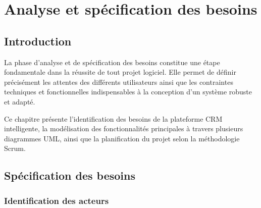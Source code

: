 
\chapter{Analyse et spécification des besoins}

\section{Introduction}
\label{sec:chap2_introduction}

La phase d'analyse et de spécification des besoins constitue une étape fondamentale dans la
réussite de tout projet logiciel. Elle permet de définir précisément les attentes des différents
utilisateurs ainsi que les contraintes techniques et fonctionnelles indispensables à la conception
d'un système robuste et adapté.

Ce chapitre présente l'identification des besoins de la plateforme CRM intelligente, la
modélisation des fonctionnalités principales à travers plusieurs diagrammes UML, ainsi que la
planification du projet selon la méthodologie Scrum. \cite{ScrumGuide}

\section{Spécification des besoins}
\label{sec:specification_besoins}

\subsection{Identification des acteurs}

